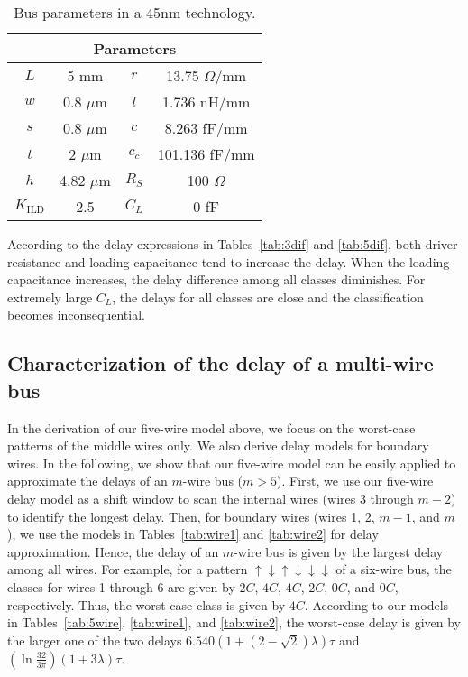 \documentclass[10pt,journal]{IEEEtran}
\def\d{\downarrow}
\def\u{\uparrow}
\begin{document}
\begin{table}[!t]
\caption{Bus parameters in a 45$\mathrm{nm}$ technology.} \label{tab:parameter}
\begin{center}
\begin{tabular}{|c|c||c|c|}
\hline
\multicolumn{4}{|c|}{Parameters} \\
\hline
$L$ & 5 mm & $r$ & 13.75 $\Omega$/mm \\
\hline
$w$ & 0.8 $\mu$m & $l$ & 1.736 nH/mm \\
\hline
$s$ & 0.8 $\mu$m & $c$ & 8.263 fF/mm \\
\hline
$t$ & 2 $\mu$m & $c_c$ & 101.136 fF/mm \\
\hline
$h$ & 4.82 $\mu$m & $R_S$ & 100 $\Omega$ \\
\hline
$K_{\textrm{ILD}}$ & 2.5 & $C_L$ & 0 fF \\
\hline
\end{tabular}
\end{center}
\end{table}

According to the delay expressions in Tables~\ref{tab:3dif} and \ref{tab:5dif}, both driver resistance and loading capacitance tend to increase the delay. When the loading capacitance increases, the delay difference among all classes diminishes. For extremely large $C_L$, the delays for all classes are close and the classification becomes inconsequential.






\subsection{Characterization of the delay of a multi-wire bus}
\label{sec:application}


In the derivation of our five-wire model above, we focus on the worst-case patterns of the middle wires only.
We also derive delay models for boundary wires. In the following, we show that our five-wire model can be easily applied to approximate the delays of an $m$-wire bus ($m>5$).
First, we use our five-wire delay model as a shift window to scan the internal wires (wires 3 through $m-2$) to identify the longest delay.
Then, for boundary wires (wires 1, 2, $m-1$, and $m$), we use the models in Tables~\ref{tab:wire1} and \ref{tab:wire2} for delay approximation. Hence, the delay of an $m$-wire bus is given by the largest delay among all wires.
For example, for a pattern $\u\d\u\d\d\d$ of a six-wire bus, the classes for wires 1 through 6 are given by $2C$, $4C$, $4C$, $2C$, $0C$, and $0C$, respectively. Thus, the worst-case class is given by $4C$. According to our models in Tables~\ref{tab:5wire}, \ref{tab:wire1}, and \ref{tab:wire2}, the worst-case delay is given by the larger one of the two delays $6.540(1+(2-\sqrt{2})\lambda)\tau$ and $\left(\ln{\frac{32}{3\pi}}\right)(1+3\lambda)\tau$.
\end{document}
